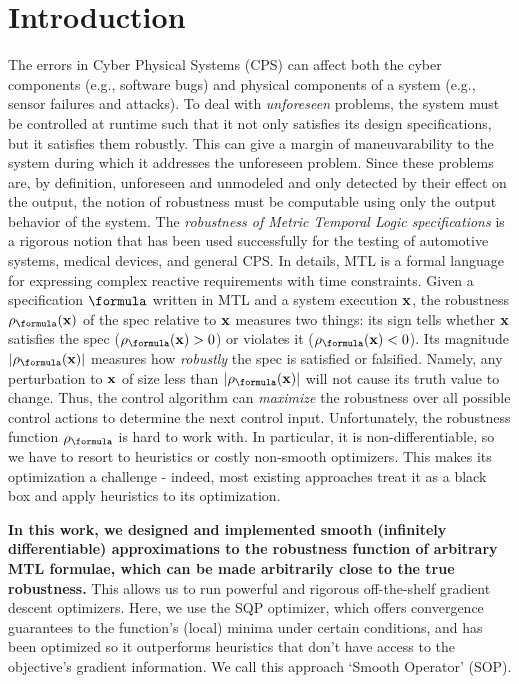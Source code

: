 \section{Introduction}
\label{sec:intro}
The errors in Cyber Physical Systems (CPS) can affect both the cyber components (e.g., software bugs) and physical components of a system (e.g., sensor failures and attacks).
To deal with \textit{unforeseen} problems, the system must be controlled at runtime such that it not only satisfies its design specifications, but it satisfies them robustly.
This can give a margin of maneuvarability to the system during which it addresses the unforeseen problem.
Since these problems are, by definition, unforeseen and unmodeled and only detected by their effect on the output, the notion of robustness must be computable using only the output behavior of the system.
%
The \textit{robustness of Metric Temporal Logic specifications} \cite{Fainekos2006_TLVerifSimu,Donze2010} is a rigorous notion that has been used successfully for the testing of automotive systems, medical devices, and general CPS.
In details, MTL is a formal language for expressing complex reactive requirements with time constraints.
Given a specification $\formula$ written in MTL and a system execution $\mathbf{x}$, the robustness $\robf(\sstraj)$ of the spec relative to $\mathbf{x}$ measures two things:
its sign tells whether $\mathbf{x}$ satisfies the spec ($\robf(\sstraj) > 0$) or violates it ($\robf(\sstraj) <0$).
Its magnitude $|\robf(\sstraj)|$ measures how \textit{robustly} the spec is satisfied or falsified.
Namely, any perturbation to $\mathbf{x}$ of size less than $|\robf(\sstraj)|$ will not cause its truth value to change.
Thus, the control algorithm can \textit{maximize} the robustness over all possible control actions to determine the next control input.
Unfortunately, the robustness function $\robf$ is hard to work with.
In particular, it is non-differentiable, so we have to resort to heuristics or costly non-smooth optimizers. 
This makes its optimization a challenge - indeed, most existing approaches treat it as a black box and apply heuristics to its optimization.

\textbf{In this work, we designed and implemented smooth (infinitely differentiable) approximations to the robustness function of arbitrary MTL formulae, which can be made arbitrarily close to the true robustness.}
This allows us to run powerful and rigorous off-the-shelf gradient descent optimizers.
Here, we use the SQP optimizer, which offers convergence guarantees to the function's (local) minima under certain conditions, and has been optimized so it outperforms heuristics that don't have access to the objective's gradient information.
We call this approach `Smooth Operator' (SOP).


